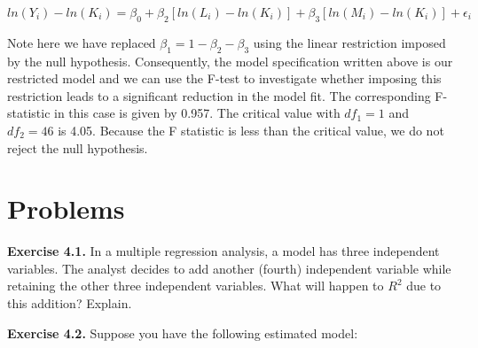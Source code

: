 \documentclass[
]{book}
\theoremstyle{definition}
\theoremstyle{definition}
\theoremstyle{definition}
\theoremstyle{definition}
\theoremstyle{remark}
\begin{document}
\[ln(Y_i)-ln(K_i) = \beta_0+ \beta_2 [ln (L_i)-ln(K_i)] +\beta_3 [ln (M_i)-ln(K_i)]+ \epsilon_i\]

Note here we have replaced \(\beta_1=1- \beta_2-\beta_3\) using the linear restriction imposed by the null hypothesis. Consequently, the model specification written above is our restricted model and we can use the F-test to investigate whether imposing this restriction leads to a significant reduction in the model fit. The corresponding F-statistic in this case is given by 0.957. The critical value with \(df_1=1\) and \(df_2=46\) is 4.05. Because the F statistic is less than the critical value, we do not reject the null hypothesis.

\hypertarget{problems-3}{%
\section*{Problems}\label{problems-3}}

\textbf{Exercise 4.1.} In a multiple regression analysis, a model has three independent variables. The analyst decides to add another (fourth) independent variable while retaining the other three independent variables. What will happen to \(R^2\) due to this addition? Explain.

\textbf{Exercise 4.2.} Suppose you have the following estimated model:
\end{document}
